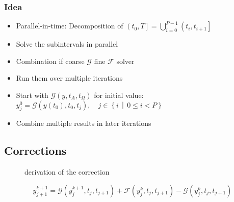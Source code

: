 \begin{frame}
    \frametitle{Idea}
    \begin{itemize}[<+->]
        \item Parallel-in-time: Decomposition of \(\left(t_0, T\right] = \bigcup_{i=0}^{P-1} \left(t_i, t_{i+1}\right]\)
        \item Solve the subintervals in parallel
        \item Combination if coarse \(\mathcal{G}\) fine \(\mathcal{F}\) solver
        \item Run them over multiple iterations
        \item Start with \(\mathcal{G}\!\left(y, t_{A}, t_{\Omega}\right)\) for initial value:\\\(y_{j}^{0} = \mathcal{G}\!\left(y(t_0), t_0, t_{j}\right), \quad j \in \left\{i \,\middle|\, 0 \leq i < P\right\}\)
        \item Combine multiple results in later iterations
    \end{itemize}
    \end{frame}

\subsection{Corrections}

\begin{frame}
\begin{figure}[ht]
    \centering
        \begin{tikzpicture}[scale=1.7]
            
        \end{tikzpicture}
    \caption{derivation of the correction}
    \label{fig:merge}
\end{figure}
\pause
\begin{equation*}
    y_{j+1}^{k+1} = \mathcal{G}\!\!\left(y_j^{k+1}, t_j, t_{j+1}\right) + \mathcal{F}\!\!\left(y_j^k, t_j, t_{j+1}\right) - \mathcal{G}\!\!\left(y_j^k, t_j, t_{j+1}\right)
    \end{equation*}
\end{frame}



